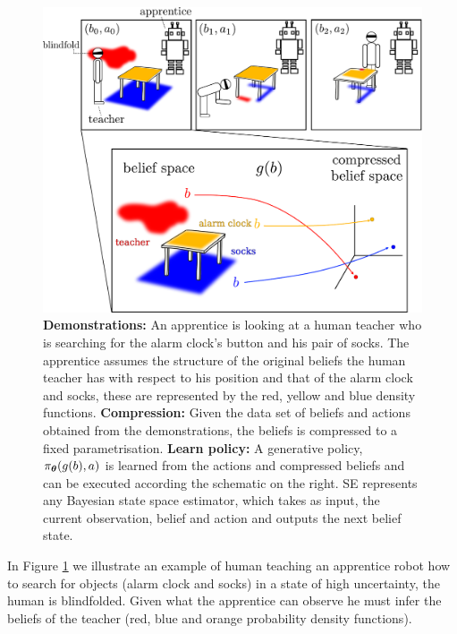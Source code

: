 \begin{figure}
 \centering
 \includegraphics[width=\textwidth]{./ch2-Background/Figures/human_search.pdf}
 \caption{\textbf{Demonstrations:} An apprentice is looking at a human teacher who is searching for the
 alarm clock's button and his pair of socks. The apprentice assumes the structure of the original beliefs the human teacher has with respect to his 
 position and that of the alarm clock and socks, these are represented by the red, yellow and blue density functions. \textbf{Compression:} Given the data set of beliefs and actions obtained from the demonstrations, the beliefs 
 is compressed to a fixed parametrisation. \textbf{Learn policy:} A generative policy, $\operatorname{\pi_{\boldsymbol{\theta}}}(g(b),a)$ is learned from the actions and compressed beliefs and can be executed 
 according the schematic on the right. SE represents any Bayesian state space estimator, which takes as input, the current observation, belief and action and outputs the next 
 belief state.}
 \label{fig:human_search}
\end{figure}

In Figure \ref{fig:human_search} we illustrate an example of human teaching an apprentice robot how to search for 
objects (alarm clock and socks) in a state of high uncertainty, the human is blindfolded. Given what the apprentice can 
observe he must infer the beliefs of the teacher (red, blue and orange probability density functions).

